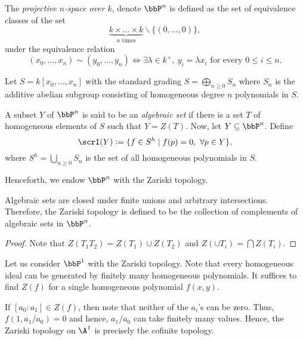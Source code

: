 \begin{definition}
    The \emph{projective $n$-space over $k$}, denote $\bbP^n$ is defined as the set of equivalence classes of the set 
    \begin{equation*}
        \underbrace{k\times\dots\times k}_{n\text{ times}}\backslash\{(0,\dots,0)\},
    \end{equation*}
    under the equivalence relation 
    \begin{equation*}
        (x_0,\dots,x_n)\sim(y_0,\dots,y_n)\iff\exists\lambda\in k^\times,~y_i = \lambda x_i\text{ for every }0\le i\le n.
    \end{equation*}

    Let $S = k[x_0,\dots,x_n]$ with the standard grading $S = \bigoplus_{n\ge 0} S_n$ where $S_n$ is the additive abelian subgroup consisting of homogeneous degree $n$ polynomials in $S$.
\end{definition}

\begin{definition}
    A subset $Y$ of $\bbP^n$ is said to be an \emph{algebraic set} if there is a set $T$ of homogeneous elements of $S$ such that $Y = Z(T)$. Now, let $Y\subseteq\bbP^n$. Define 
    \begin{equation*}
        \scrI(Y) := \{f\in S^h\mid f(p) = 0,~\forall p\in Y\},
    \end{equation*}
    where $S^h = \bigcup_{n\ge 0}S_n$ is the set of all homogeneous polynomials in $S$.
\end{definition}

Henceforth, we endow $\bbP^n$ with the Zariski topology.

\begin{proposition}
    Algebraic sets are closed under finite unions and arbitrary intersections. Therefore, the Zariski topology is defined to be the collection of complements of algebraic sets in $\bbP^n$.
\end{proposition}
\begin{proof}
    Note that $Z(T_1T_2) = Z(T_1)\cup Z(T_2)$ and $Z(\cup T_i) = \bigcap Z(T_i)$. 
\end{proof}

\begin{example}
    Let us consider $\bbP^1$ with the Zariski topology. Note that every homogeneous ideal can be generated by finitely many homogeneous polynomials. It suffices to find $Z(f)$ for a single homogeneous polynomial $f(x,y)$.

    If $[a_0 : a_1]\in Z(f)$, then note that neither of the $a_i$'s can be zero. Thus, $f(1, a_1/a_0) = 0$ and hence, $a_1/a_0$ can take finitely many values. Hence, the Zariski topology on $\A^1$ is precisely the cofinite topology.
\end{example}

